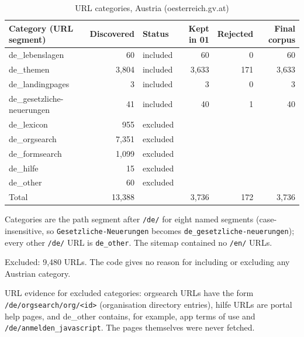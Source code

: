 \begin{table}[htbp]
\centering
\small
\begin{threeparttable}
\caption{URL categories, Austria (oesterreich.gv.at)}
\label{tab:dc_categories_austria}
\begin{tabular}{lrlrrr}
\hline
Category (URL segment) & Discovered & Status & Kept in 01 & Rejected & Final corpus \\
\hline
de\_lebenslagen & 60 & included & 60 & 0 & 60 \\
de\_themen & 3,804 & included & 3,633 & 171 & 3,633 \\
de\_landingpages & 3 & included & 3 & 0 & 3 \\
de\_gesetzliche-neuerungen & 41 & included & 40 & 1 & 40 \\
de\_lexicon & 955 & excluded &  &  &  \\
de\_orgsearch & 7,351 & excluded &  &  &  \\
de\_formsearch & 1,099 & excluded &  &  &  \\
de\_hilfe & 15 & excluded &  &  &  \\
de\_other & 60 & excluded &  &  &  \\
\hline
Total & 13,388 &  & 3,736 & 172 & 3,736 \\
\hline
\end{tabular}
\begin{tablenotes}
\footnotesize
\item Categories are the path segment after \texttt{/de/} for eight named segments (case-insensitive, so \texttt{Gesetzliche-Neuerungen} becomes \texttt{de\_gesetzliche-neuerungen}); every other \texttt{/de/} URL is \texttt{de\_other}. The sitemap contained no \texttt{/en/} URLs.
\item Excluded: 9,480 URLs. The code gives no reason for including or excluding any Austrian category.
\item URL evidence for excluded categories: orgsearch URLs have the form \texttt{/de/orgsearch/org/<id>} (organisation directory entries), hilfe URLs are portal help pages, and de\_other contains, for example, app terms of use and \texttt{/de/anmelden\_javascript}. The pages themselves were never fetched.
\end{tablenotes}
\end{threeparttable}
\end{table}
